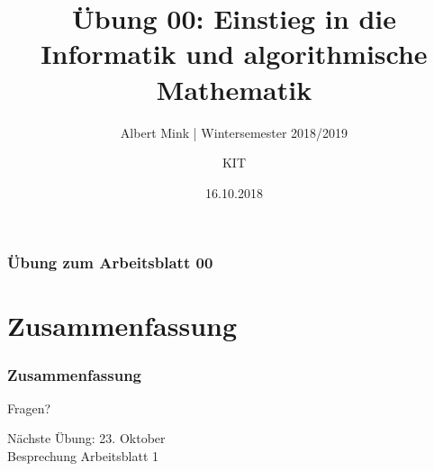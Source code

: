\documentclass[c,18pt]{beamer}
\date{16.10.2018}
\title[Übung 00: Einstieg in die Informatik und algorithmische Mathematik]
  {Übung 00: Einstieg in die Informatik und algorithmische Mathematik}
\subtitle{Albert Mink | Wintersemester 2018/2019}
\author[Albert Mink, ]{KIT}
\institute[Institut für Angewandte und Numerische Mathematik (IANM)]{Institut für Angewandte und Numerische Mathematik}
\begin{document}
\begin{frame}
  \maketitle
\end{frame}

\begin{frame}
  \frametitle{Übung zum Arbeitsblatt 00}%
\tableofcontents[hideallsubsections]
\end{frame}

\def\kap{1}%
\def\kap{2}%
\def\kap{3}%
\def\kap{4}%

\def\kap{5}%
\def\kap{6}%


\section{Zusammenfassung}
\begin{frame}
  \frametitle{Zusammenfassung}%
\tableofcontents[hideallsubsections]
\end{frame}

\begin{frame}
\centering
\Huge\textcolor{KITgreen}{Fragen?}
\vspace{2cm}

{\LARGE
N\"achste \"Ubung: 23. Oktober\\
Besprechung Arbeitsblatt 1
}
\end{frame}


\end{document}
